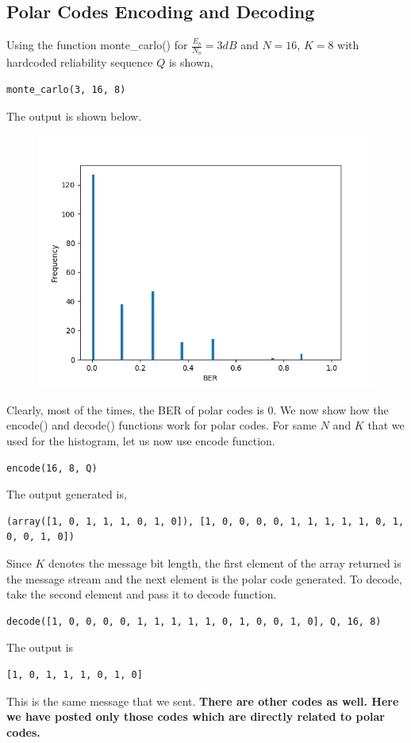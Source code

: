 \documentclass{report}
\begin{document}
\subsection*{Polar Codes Encoding and Decoding}

Using the function monte\_carlo() for $\frac{E_{b}}{N_{o}} = 3 dB$ and $N=16$, $K=8$ with hardcoded reliability sequence $Q$ is shown,
\begin{lstlisting}
monte_carlo(3, 16, 8)
\end{lstlisting}
The output is shown below.
\begin{figure}[H]
\centering
\includegraphics[width=\textwidth, height=0.4\textheight]{hist.png}
\end{figure}
Clearly, most of the times, the BER of polar codes is 0. We now show how the encode() and decode() functions work for polar codes. For  same $N$ and $K$ that we used for the histogram, let us now use encode function.
\begin{lstlisting}
encode(16, 8, Q)
\end{lstlisting}
The output generated is,
\begin{lstlisting}
(array([1, 0, 1, 1, 1, 0, 1, 0]), [1, 0, 0, 0, 0, 1, 1, 1, 1, 1, 0, 1, 0, 0, 1, 0])
\end{lstlisting}
Since $K$ denotes the message bit length, the first element of the array returned is the message stream and the next element is the polar code generated. To decode, take the second element and pass it to decode function.
\begin{lstlisting}
decode([1, 0, 0, 0, 0, 1, 1, 1, 1, 1, 0, 1, 0, 0, 1, 0], Q, 16, 8)
\end{lstlisting}
The output is 
\begin{lstlisting}
[1, 0, 1, 1, 1, 0, 1, 0]
\end{lstlisting}
This is the same message that we sent. \textbf{There are other codes as well. Here we have posted only those codes which are directly related to polar codes.}
\newpage
\end{document}
